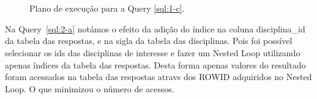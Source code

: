 \documentclass[a4paper,12pt]{article}
\begin{document}
\begin{figure}[hpt]
   \begin{center}
      \\
      \\
   \end{center}
   \caption{Plano de execução para a Query \ref{sql:1-c}.}
   \label{fig:plano_1-c}
\end{figure}

Na Query~\ref{sql:2-a} notámos o efeito da adição do índice na coluna disciplina\_id
da tabela das respostas, e na sigla da tabela das disciplinas. Pois foi possível selecionar
os ids das disciplinas de interesse e fazer um Nested Loop utilizando apenas
índices da tabela das respostas. Desta forma apenas valores do resultado foram
acessados na tabela das respostas atravs dos ROWID adquiridos no Nested Loop.
O que minimizou o número de acessos.

\begin{program}
   
   \caption{Pergunta sobre agregação 2.a.}
   \label{sql:2-a}
\end{program}
\end{document}
